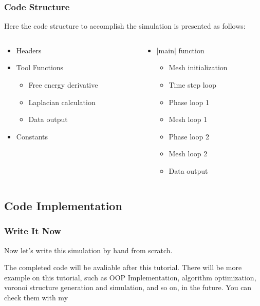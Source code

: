 \documentclass[compress,xcolor={dvipsnames}]{beamer}
\newcommand{\bhref}[2]{
    \href{#1}{\color{blue}{#2}}
}
\begin{document}
\begin{frame}[fragile]
    \frametitle{Code Structure}

    Here the code structure to accomplish the simulation is presented as follows:
    \begin{columns}
        \begin{column}{.5\linewidth}
            \begin{itemize}
                \item Headers
                \item Tool Functions
                      \begin{itemize}
                          \item Free energy derivative
                          \item Laplacian calculation
                          \item Data output
                      \end{itemize}
                \item Constants
            \end{itemize}
        \end{column}
        \hspace{-20pt}
        \begin{column}{.5\linewidth}
            \begin{itemize}
                \item \cverb|main| function
                      \begin{itemize}
                          \item Mesh initialization
                          \item Time step loop
                          \item Phase loop 1
                          \item Mesh loop 1
                          \item Phase loop 2
                          \item Mesh loop 2
                          \item Data output
                      \end{itemize}
            \end{itemize}
        \end{column}
    \end{columns}

\end{frame}

\subsection{Code Implementation}
\begin{frame}
    \frametitle{Write It Now}

    Now let's write this simulation by hand from scratch.

    The completed code will be avaliable after this tutorial. There will be more example on this tutorial, such as OOP Implementation, algorithm optimization, voronoi structure generation and simulation, and so on, in the future. You can check them with my \bhref{https://github.com/A-moment096/Phase-Field-Tutorial}{Github}

\end{frame}
\end{document}
